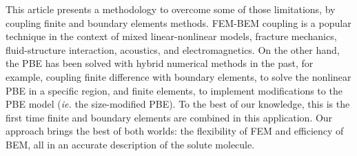 This article presents a methodology to overcome some of those limitations, by coupling finite and boundary elements methods.
FEM-BEM coupling is a popular technique in the context of mixed linear-nonlinear models,\cite{carstensen1995coupling,aurada2013classical} fracture mechanics,\cite{aour2007coupled} fluid-structure interaction,\cite{estorff1991fem} acoustics,\cite{hiptmair2006stabilized} and electromagnetics.\cite{matsuoka1988calculation,hiptmair2008stabilized,bruckner20123d}
On the other hand, the PBE has been solved with hybrid numerical methods in the past, for example, coupling finite difference with boundary elements,\cite{boschitsch2004hybrid} to solve the nonlinear PBE in a specific region, and finite elements,\cite{xie2016new,ying2018hybrid} to implement modifications to the PBE model ({\it ie.} the size-modified PBE).
To the best of our knowledge, this is the first time finite and boundary elements are combined in this application.
Our approach brings the best of both worlds: the flexibility of FEM and efficiency of BEM, all in an accurate description of the solute molecule.
